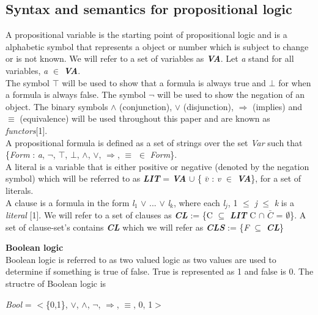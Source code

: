 \documentclass[11pt,a4paper]{report}
\begin{document}
\subsection{Syntax and semantics for propositional logic}
A propositional variable is the starting point of propositional logic and is a alphabetic symbol that represents a object or number which is subject to change or is not known. We will refer to a set of variables as \textit{\textbf{VA}}. Let \textit{a} stand for all variables, \textit{a} $\in$ \textit{\textbf{VA}}.\\
The symbol $\top$ will be used to show that a formula is always true and $\bot$ for when a formula is always false. The symbol $\neg$ will be used to show the negation of an object. The binary symbols $\land$ (conjunction), $\lor$ (disjunction), $\Rightarrow$ (implies) and $\equiv$ (equivalence) will be used throughout this paper and are known as \textit{functors}[1].  \\
\noindent A propositional formula is defined as a set of strings over the set \textit{Var} such that \{\textit{Form} : \textit{a}, $\neg$, $\top$, $\bot$, $\land$, $\lor$, $\Rightarrow$, $\equiv$ $\in$ \textit{Form}\}. \\


A literal is a variable that is either positive or negative (denoted by the negation symbol) which will be referred to as \textbf{\textit{LIT}} =  \textit{\textbf{VA}} $\cup$ \{ \textit{$\bar{v}$} : \textit{v} $\in$ \textbf{\textit{VA}}\}, for a set of literals.\\

A clause is a formula in the form \textit{l$_1$} $\lor$ ... $\lor$ \textit{l$_k$}, where each \textit{l$_j$}, 1 $\le$ \textit{j} $\le$ \textit{k} is a \textit{literal} [1]. We will refer to a set of clauses as \textbf{\textit{CL}} := \{C $\subseteq$ \textbf{\textit{LIT}} C $\cap$ $\bar{C}$ = $\emptyset$\}. A set of clause-set's contains \textbf{\textit{CL}} which we will refer as \textbf{\textit{CLS}} := \{\textit{F} $\subseteq$ \textit{\textbf{CL}}\}  


\textbf{Boolean logic}\\
Boolean logic is referred to as two valued logic as two values are used to determine if something is true of false. True is represented as 1 and false is 0. The structre of Boolean logic is
\begin{center}
\textit{Bool} = $<$\{0,1\}, $\lor$, $\land$, $\neg$, $\Rightarrow$, $\equiv$, 0, 1$>$
\end{center}
\end{document}
